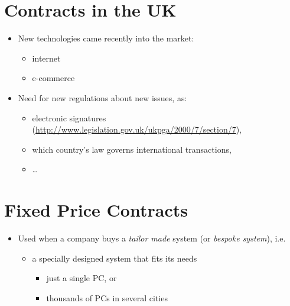 \documentclass{article}
\begin{document}
\section{Contracts in the UK}
\begin{itemize}
\item New technologies came recently into the market: 
\begin{itemize}
\item internet
\item e-commerce
\end{itemize}
\item Need for new regulations about new issues, as:
\begin{itemize}
\item electronic signatures (\url{http://www.legislation.gov.uk/ukpga/2000/7/section/7}),
\item which country's law governs international transactions,
\item \ldots 
\end{itemize}
\end{itemize}



\section{Fixed Price Contracts}
\begin{itemize}
\item Used when a company buys a \emph{tailor made} system (or \emph{bespoke system}), i.e.
\begin{itemize}
\item a specially designed system that fits its needs
\begin{itemize}
\item just a single PC, or
\item thousands of PCs in several cities
\end{itemize}
\end{itemize}
\end{itemize}
\end{document}
